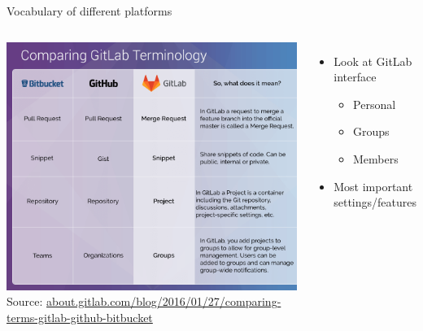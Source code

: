 \documentclass[aspectratio=169]{beamer}
\begin{document}
\begin{frame}[t]
  {Vocabulary of different platforms}

  \begin{columns}
  \includegraphics[width=\textwidth]{gitlab-terminology}\\[-.2cm]
  {\tiny Source:
    \href{https://about.gitlab.com/blog/2016/01/27/comparing-terms-gitlab-github-bitbucket}%
    {about.gitlab.com/blog/2016/01/27/comparing-terms-gitlab-github-bitbucket}
  }

    \begin{itemize}\itemsep.5cm
      \item Look at GitLab interface
        \begin{itemize}
          \item Personal
          \item Groups
          \item Members
        \end{itemize}
      \item Most important settings/features
    \end{itemize}
  \end{columns}
\end{frame}
\end{document}
